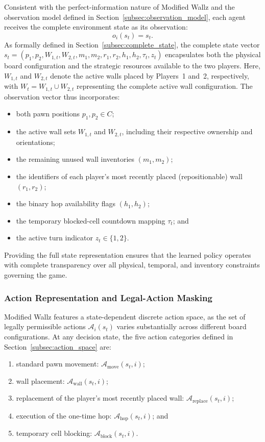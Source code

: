 \documentclass{article}
\begin{document}
Consistent with the perfect-information nature of Modified Wallz and the observation model defined in Section~\ref{subsec:observation_model}, each agent receives the complete environment state as its observation:
\begin{equation}
o_i(s_t) = s_t.
\end{equation}
As formally defined in Section~\ref{subsec:complete_state}, the complete state vector $s_t = (p_1, p_2, W_{1,t}, W_{2,t}, m_1, m_2, r_1, r_2, h_1, h_2, \tau_t, z_t)$ encapsulates both the physical board configuration and the strategic resources available to the two players. Here, $W_{1,t}$ and $W_{2,t}$ denote the active walls placed by Players~1 and~2, respectively, with $W_t = W_{1,t} \cup W_{2,t}$ representing the complete active wall configuration. The observation vector thus incorporates:
\begin{itemize}
    \item both pawn positions $p_1, p_2 \in C$;
    \item the active wall sets $W_{1,t}$ and $W_{2,t}$, including their respective ownership and orientations;
    \item the remaining unused wall inventories $(m_1, m_2)$;
    \item the identifiers of each player's most recently placed (repositionable) wall $(r_1, r_2)$;
    \item the binary hop availability flags $(h_1, h_2)$;
    \item the temporary blocked-cell countdown mapping $\tau_t$; and
    \item the active turn indicator $z_t \in \{1, 2\}$.
\end{itemize}
Providing the full state representation ensures that the learned policy operates with complete transparency over all physical, temporal, and inventory constraints governing the game.

\subsubsection{Action Representation and Legal-Action Masking}
\label{subsubsec:action_masking}

Modified Wallz features a state-dependent discrete action space, as the set of legally permissible actions $\mathcal{A}_i(s_t)$ varies substantially across different board configurations. At any decision state, the five action categories defined in Section~\ref{subsec:action_space} are:
\begin{enumerate}
    \item standard pawn movement: $\mathcal{A}_{\text{move}}(s_t, i)$;
    \item wall placement: $\mathcal{A}_{\text{wall}}(s_t, i)$;
    \item replacement of the player's most recently placed wall: $\mathcal{A}_{\text{replace}}(s_t, i)$;
    \item execution of the one-time hop: $\mathcal{A}_{\text{hop}}(s_t, i)$; and
    \item temporary cell blocking: $\mathcal{A}_{\text{block}}(s_t, i)$.
\end{enumerate}
\end{document}
